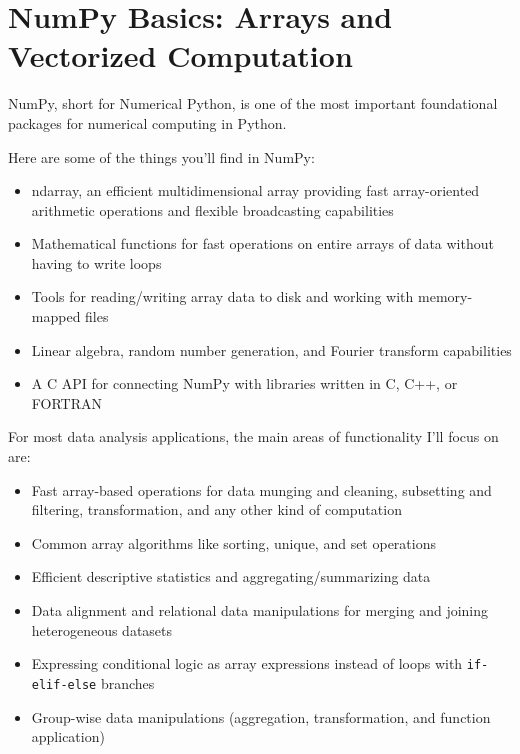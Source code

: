 \chapter{NumPy Basics: Arrays and Vectorized Computation}
NumPy, short for Numerical Python, is one of the most important foundational packages for numerical computing in Python. 

Here are some of the things you’ll find in NumPy:
\begin{itemize}
    \item ndarray, an efficient multidimensional array providing fast array-oriented arithmetic operations and flexible broadcasting capabilities
    \item Mathematical functions for fast operations on entire arrays of data without having to write loops
    \item Tools for reading/writing array data to disk and working with memory-mapped files
    \item Linear algebra, random number generation, and Fourier transform capabilities
    \item A C API for connecting NumPy with libraries written in C, C++, or FORTRAN
\end{itemize}

For most data analysis applications, the main areas of functionality I’ll focus on are:

\begin{itemize}
    \item Fast array-based operations for data munging and cleaning, subsetting and filtering, transformation, and any other kind of computation
    \item Common array algorithms like sorting, unique, and set operations
    \item Efficient descriptive statistics and aggregating/summarizing data
    \item Data alignment and relational data manipulations for merging and joining heterogeneous datasets
    \item Expressing conditional logic as array expressions instead of loops with \verb|if-elif-else| branches
    \item Group-wise data manipulations (aggregation, transformation, and function application)
\end{itemize}

